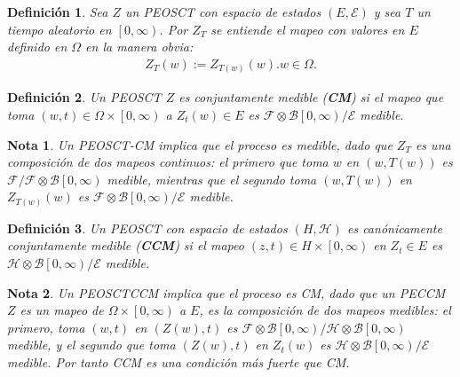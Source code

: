 \documentclass{article}
\newtheorem{Def}{Definición}[section]
\newtheorem{Note}{Nota}[section]
\numberwithin{equation}{section}
\begin{document}
\begin{Def}
Sea $Z$ un PEOSCT  con espacio de estados $\left(E,\mathcal{E}\right)$ y sea $T$ un tiempo aleatorio en $\left[0,\infty\right)$. Por $Z_{T}$ se entiende el mapeo con valores en $E$ definido en $\Omega$ en la manera obvia:
\begin{eqnarray}
Z_{T}\left(w\right):=Z_{T\left(w\right)}\left(w\right). w\in\Omega.
\end{eqnarray}
\end{Def}

\begin{Def}
Un PEOSCT $Z$ es conjuntamente medible (\textbf{CM}) si el mapeo que toma $\left(w,t\right)\in\Omega\times\left[0,\infty\right)$ a $Z_{t}\left(w\right)\in E$ es $\mathcal{F}\otimes\mathcal{B}\left[0,\infty\right)/\mathcal{E}$ medible.
\end{Def}

\begin{Note}
Un PEOSCT-CM implica que el proceso es medible, dado que $Z_{T}$ es una composici\'on  de dos mapeos continuos: el primero que toma $w$ en $\left(w,T\left(w\right)\right)$ es $\mathcal{F}/\mathcal{F}\otimes\mathcal{B}\left[0,\infty\right)$ medible, mientras que el segundo toma $\left(w,T\left(w\right)\right)$ en $Z_{T\left(w\right)}\left(w\right)$ es $\mathcal{F}\otimes\mathcal{B}\left[0,\infty\right)/\mathcal{E}$ medible.
\end{Note}


\begin{Def}
Un PEOSCT con espacio de estados $\left(H,\mathcal{H}\right)$ es can\'onicamente conjuntamente medible (\textbf{CCM}) si el mapeo $\left(z,t\right)\in H\times\left[0,\infty\right)$ en $Z_{t}\in E$ es $\mathcal{H}\otimes\mathcal{B}\left[0,\infty\right)/\mathcal{E}$ medible.
\end{Def}

\begin{Note}
Un PEOSCTCCM implica que el proceso es CM, dado que un PECCM $Z$ es un mapeo de $\Omega\times\left[0,\infty\right)$ a $E$, es la composici\'on de dos mapeos medibles: el primero, toma $\left(w,t\right)$ en $\left(Z\left(w\right),t\right)$ es $\mathcal{F}\otimes\mathcal{B}\left[0,\infty\right)/\mathcal{H}\otimes\mathcal{B}\left[0,\infty\right)$ medible, y el segundo que toma $\left(Z\left(w\right),t\right)$  en $Z_{t}\left(w\right)$ es $\mathcal{H}\otimes\mathcal{B}\left[0,\infty\right)/\mathcal{E}$ medible. Por tanto CCM es una condici\'on m\'as fuerte que CM.
\end{Note}
\end{document}
